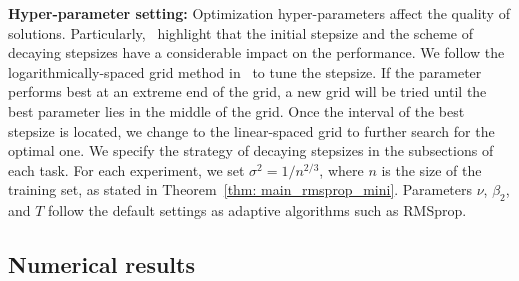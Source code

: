 \documentclass[11pt]{article}
\begin{document}
\textbf{Hyper-parameter setting:} 
Optimization hyper-parameters affect the quality of solutions. 
Particularly,~\citep{wiro17} highlight that the initial stepsize and the scheme of decaying stepsizes have a considerable impact on the performance. 
We follow the logarithmically-spaced grid method in~\citep{wiro17} to tune the stepsize. 
If the parameter performs best at an extreme end of the grid, a new grid will be tried until the best parameter lies in the middle of the grid. 
Once the interval of the best stepsize is located, we change to the linear-spaced grid to further search for the optimal one. 
We specify the strategy of decaying stepsizes in the subsections of each task. 
For each experiment, we set $\sigma^2 = 1/n^{2/3}$, where $n$ is the size of the training set, as stated in Theorem~\ref{thm: main_rmsprop_mini}. 
Parameters $\nu$, $\beta_2$, and $T$ follow the default settings as adaptive algorithms such as RMSprop. 

\subsection{Numerical results}\label{subsec:results}
\end{document}
